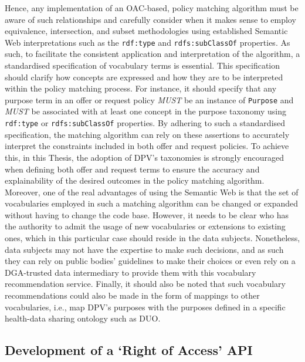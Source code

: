 \begin{table}[ht]
{\begin{tabular}{c|c|c||c|c||c|c}
\end{tabular}}
\end{table}

Hence, any implementation of an OAC-based, policy matching algorithm must be aware of such relationships and carefully consider when it makes sense to employ equivalence, intersection, and subset methodologies using established Semantic Web interpretations such as the \texttt{rdf:type} and \texttt{rdfs:subClassOf} properties.
As such, to facilitate the consistent application and interpretation of the algorithm, a standardised specification of vocabulary terms is essential.
This specification should clarify how concepts are expressed and how they are to be interpreted within the policy matching process.
For instance, it should specify that any purpose term in an offer or request policy \textit{MUST} be an instance of \texttt{Purpose} and \textit{MUST} be associated with at least one concept in the purpose taxonomy using \texttt{rdf:type} or \texttt{rdfs:subClassOf} properties.
By adhering to such a standardised specification, the matching algorithm can rely on these assertions to accurately interpret the constraints included in both offer and request policies.
To achieve this, in this Thesis, the adoption of DPV's taxonomies is strongly encouraged when defining both offer and request terms to ensure the accuracy and explainability of the desired outcomes in the policy matching algorithm.
Moreover, one of the real advantages of using the Semantic Web is that the set of vocabularies employed in such a matching algorithm can be changed or expanded without having to change the code base.
However, it needs to be clear who has the authority to admit the usage of new vocabularies or extensions to existing ones, which in this particular case should reside in the data subjects.
Nonetheless, data subjects may not have the expertise to make such decisions, and as such they can rely on public bodies' guidelines to make their choices or even rely on a DGA-trusted data intermediary to provide them with this vocabulary recommendation service.
Finally, it should also be noted that such vocabulary recommendations could also be made in the form of mappings to other vocabularies, i.e., map DPV's purposes with the purposes defined in a specific health-data sharing ontology such as DUO.

\subsection{Development of a `Right of Access' API}
\label{sec:right-api}

